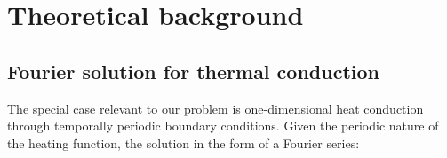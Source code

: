 \documentclass[12pt,a4]{article}
\begin{document}
 





\section{Theoretical background}
\subsection{Fourier solution for thermal conduction}

The special case relevant to our problem is one-dimensional heat conduction through temporally periodic boundary conditions. Given the periodic nature of the heating function, the solution in the form of a Fourier series:
\end{document}
